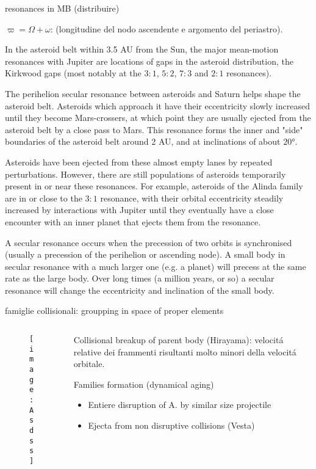 \begin{wordonframe}{resonances in MB (distribuire)}

$\varpi=\Omega+\omega$: (longitudine del nodo ascendente e argomento del periastro).

In the asteroid belt within 3.5 AU from the Sun, the major mean-motion resonances with Jupiter are locations of gaps in the asteroid distribution, the Kirkwood gaps (most notably at the $3:1$, $5:2$, $7:3$ and $2:1$ resonances).

The perihelion secular resonance between asteroids and Saturn  helps shape the asteroid belt. Asteroids which approach it have their eccentricity slowly increased until they become Mars-crossers, at which point they are usually ejected from the asteroid belt by a close pass to Mars. This resonance forms the inner and "side" boundaries of the asteroid belt around 2 AU, and at inclinations of about $\ang{20}$.

Asteroids have been ejected from these almost empty lanes by repeated perturbations. However, there are still populations of asteroids temporarily present in or near these resonances. For example, asteroids of the Alinda family are in or close to the $3:1$ resonance, with their orbital eccentricity steadily increased by interactions with Jupiter until they eventually have a close encounter with an inner planet that ejects them from the resonance.

A secular resonance occurs when the precession of two orbits is synchronised (usually a precession of the perihelion or ascending node). A small body in secular resonance with a much larger one (e.g. a planet) will precess at the same rate as the large body. Over long times (a million years, or so) a secular resonance will change the eccentricity and inclination of the small body.
\end{wordonframe}

\begin{frame}{famiglie collisionali: groupping in space of proper elements}
\begin{columns}[T]
\begin{column}{0.65\textwidth}
\begin{figure}[!ht]
\texttt{[image: Asdss]}
\end{figure}
\end{column}
\begin{column}{0.35\textwidth}
Collisional breakup of parent body (Hirayama): velocit\'a relative dei frammenti risultanti molto minori della velocit\'a orbitale.
\begin{block}{Families formation (dynamical aging)}
\begin{itemize}\item Entiere disruption of A. by similar size projectile \item Ejecta from non disruptive collisions (Vesta)
\end{itemize}
\end{block}
\end{column}
\end{columns}
\end{frame}

